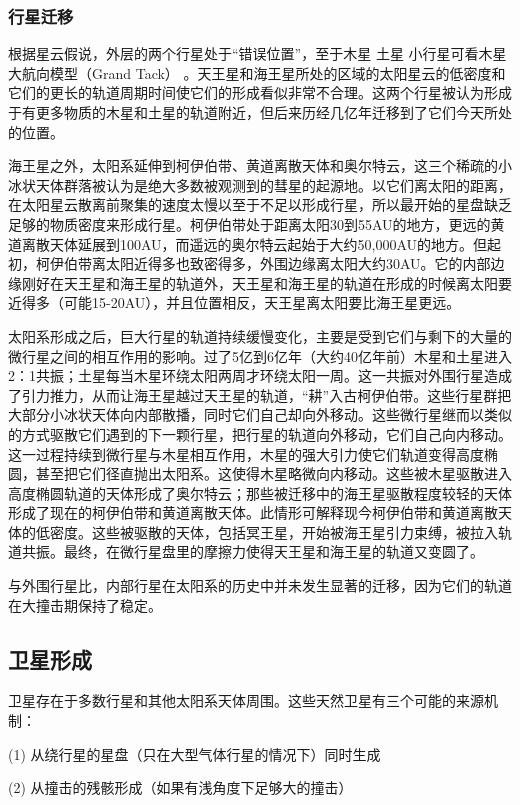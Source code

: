 \documentclass[hidelinks]{article}
\begin{document}
\subsubsection{行星迁移}
根据星云假说，外层的两个行星处于“错误位置”，至于木星 土星 小行星可看木星大航向模型（Grand Tack） 。天王星和海王星所处的区域的太阳星云的低密度和它们的更长的轨道周期时间使它们的形成看似非常不合理。这两个行星被认为形成于有更多物质的木星和土星的轨道附近，但后来历经几亿年迁移到了它们今天所处的位置。

海王星之外，太阳系延伸到柯伊伯带、黄道离散天体和奥尔特云，这三个稀疏的小冰状天体群落被认为是绝大多数被观测到的彗星的起源地。以它们离太阳的距离，在太阳星云散离前聚集的速度太慢以至于不足以形成行星，所以最开始的星盘缺乏足够的物质密度来形成行星。柯伊伯带处于距离太阳30到55AU的地方，更远的黄道离散天体延展到100AU，而遥远的奥尔特云起始于大约50,000AU的地方。但起初，柯伊伯带离太阳近得多也致密得多，外围边缘离太阳大约30AU。它的内部边缘刚好在天王星和海王星的轨道外，天王星和海王星的轨道在形成的时候离太阳要近得多（可能15-20AU），并且位置相反，天王星离太阳要比海王星更远。

太阳系形成之后，巨大行星的轨道持续缓慢变化，主要是受到它们与剩下的大量的微行星之间的相互作用的影响。过了5亿到6亿年（大约40亿年前）木星和土星进入2：1共振；土星每当木星环绕太阳两周才环绕太阳一周。这一共振对外围行星造成了引力推力，从而让海王星越过天王星的轨道，“耕”入古柯伊伯带。这些行星群把大部分小冰状天体向内部散播，同时它们自己却向外移动。这些微行星继而以类似的方式驱散它们遇到的下一颗行星，把行星的轨道向外移动，它们自己向内移动。这一过程持续到微行星与木星相互作用，木星的强大引力使它们轨道变得高度椭圆，甚至把它们径直抛出太阳系。这使得木星略微向内移动。这些被木星驱散进入高度椭圆轨道的天体形成了奥尔特云；那些被迁移中的海王星驱散程度较轻的天体形成了现在的柯伊伯带和黄道离散天体。此情形可解释现今柯伊伯带和黄道离散天体的低密度。这些被驱散的天体，包括冥王星，开始被海王星引力束缚，被拉入轨道共振。最终，在微行星盘里的摩擦力使得天王星和海王星的轨道又变圆了。

与外围行星比，内部行星在太阳系的历史中并未发生显著的迁移，因为它们的轨道在大撞击期保持了稳定。

\subsection{卫星形成}
卫星存在于多数行星和其他太阳系天体周围。这些天然卫星有三个可能的来源机制：

    (1) 从绕行星的星盘（只在大型气体行星的情况下）同时生成
    
    (2) 从撞击的残骸形成（如果有浅角度下足够大的撞击）
    
\end{document}
